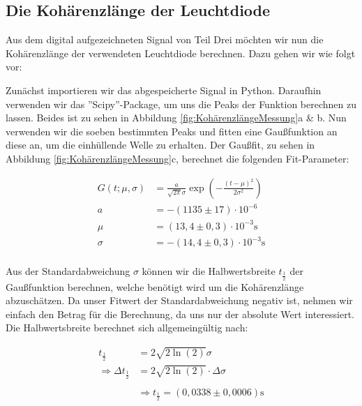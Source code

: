 \documentclass{article}
\begin{document}
\newpage
\subsection{Die Kohärenzlänge der Leuchtdiode}

Aus dem digital aufgezeichneten Signal von Teil Drei möchten wir nun die Kohärenzlänge der verwendeten Leuchtdiode berechnen. Dazu gehen wir wie folgt vor:

Zunächst importieren wir das abgespeicherte Signal in Python. Daraufhin verwenden wir das ''Scipy''-Package, um uns die Peaks der Funktion berechnen zu lassen. Beides ist zu sehen in Abbildung \ref{fig:KohärenzlängeMessung}a \& b. Nun verwenden wir die soeben bestimmten Peaks und fitten eine Gaußfunktion an diese an, um die einhüllende Welle zu erhalten. Der Gaußfit, zu sehen in Abbildung \ref{fig:KohärenzlängeMessung}c, berechnet die folgenden Fit-Parameter:

\begin{equation}
    \begin{split}
        G(t; \mu, \sigma) &= \frac{a}{\sqrt{2 \pi} \sigma} \exp{\left( -\frac{(t - \mu)^2}{2 \sigma^2} \right)} \\
        a &= -(1135 \pm 17) \cdot 10^{-6} \\
        \mu &= (13,4 \pm 0,3) \cdot 10^{-3} \text{s} \\
        \sigma &= -(14,4 \pm 0,3) \cdot 10^{-3} \text{s} \\
    \end{split}
\end{equation}

Aus der Standardabweichung $\sigma$ können wir die Halbwertsbreite $t_\frac{1}{2}$ der Gaußfunktion berechnen, welche benötigt wird um die Kohärenzlänge abzuschätzen. Da unser Fitwert der Standardabweichung negativ ist, nehmen wir einfach den Betrag für die Berechnung, da uns nur der absolute Wert interessiert. Die Halbwertsbreite berechnet sich allgemeingültig nach:

\begin{equation}
    \begin{split}
        t_\frac{1}{2} &= 2 \sqrt{2 \ln{(2)}} \sigma \\
        \Rightarrow \Delta t_\frac{1}{2} &= 2 \sqrt{2 \ln{(2)}} \cdot \Delta \sigma \\ \\
        &\Rightarrow t_\frac{1}{2} = (0,0338 \pm 0,0006) \text{s}
    \end{split}
\end{equation}
\end{document}
